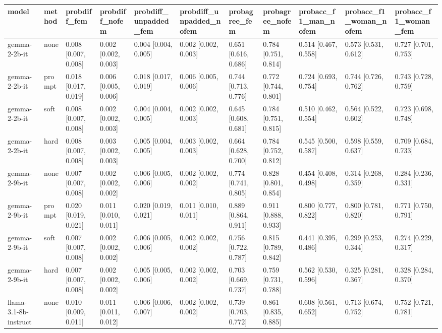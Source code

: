 \begin{tabular}{lllllllllll}
\toprule
model & method & probdiff_fem & probdiff_nofem & probdiff_unpadded_fem & probdiff_unpadded_nofem & probagree_fem & probagree_nofem & probacc_f1_man_nofem & probacc_f1_woman_nofem & probacc_f1_woman_fem \\
\midrule
gemma-2-2b-it & none & 0.008 [0.007, 0.008] & 0.002 [0.002, 0.003] & 0.004 [0.004, 0.005] & 0.002 [0.002, 0.003] & 0.651 [0.616, 0.686] & 0.784 [0.751, 0.814] & 0.514 [0.467, 0.558] & 0.573 [0.531, 0.612] & 0.727 [0.701, 0.753] \\
gemma-2-2b-it & prompt & 0.018 [0.017, 0.019] & 0.006 [0.005, 0.006] & 0.018 [0.017, 0.019] & 0.006 [0.005, 0.006] & 0.744 [0.713, 0.776] & 0.772 [0.744, 0.801] & 0.724 [0.693, 0.754] & 0.744 [0.726, 0.762] & 0.743 [0.728, 0.759] \\
gemma-2-2b-it & soft & 0.008 [0.007, 0.008] & 0.002 [0.002, 0.003] & 0.004 [0.004, 0.005] & 0.002 [0.002, 0.003] & 0.645 [0.608, 0.681] & 0.784 [0.751, 0.815] & 0.510 [0.462, 0.554] & 0.564 [0.522, 0.602] & 0.723 [0.698, 0.748] \\
gemma-2-2b-it & hard & 0.008 [0.007, 0.008] & 0.003 [0.002, 0.003] & 0.005 [0.004, 0.005] & 0.003 [0.002, 0.003] & 0.664 [0.628, 0.700] & 0.784 [0.752, 0.812] & 0.545 [0.500, 0.587] & 0.598 [0.559, 0.637] & 0.709 [0.684, 0.733] \\
gemma-2-9b-it & none & 0.007 [0.007, 0.008] & 0.002 [0.002, 0.002] & 0.006 [0.005, 0.006] & 0.002 [0.002, 0.002] & 0.774 [0.741, 0.805] & 0.828 [0.801, 0.854] & 0.454 [0.408, 0.498] & 0.314 [0.268, 0.359] & 0.284 [0.236, 0.331] \\
gemma-2-9b-it & prompt & 0.020 [0.019, 0.021] & 0.011 [0.010, 0.011] & 0.020 [0.019, 0.021] & 0.011 [0.010, 0.011] & 0.889 [0.864, 0.911] & 0.911 [0.888, 0.933] & 0.800 [0.777, 0.822] & 0.800 [0.781, 0.820] & 0.771 [0.750, 0.791] \\
gemma-2-9b-it & soft & 0.007 [0.007, 0.008] & 0.002 [0.002, 0.002] & 0.006 [0.005, 0.006] & 0.002 [0.002, 0.002] & 0.756 [0.722, 0.787] & 0.815 [0.789, 0.842] & 0.441 [0.395, 0.486] & 0.299 [0.253, 0.344] & 0.274 [0.229, 0.317] \\
gemma-2-9b-it & hard & 0.007 [0.007, 0.008] & 0.002 [0.002, 0.002] & 0.005 [0.005, 0.006] & 0.002 [0.002, 0.002] & 0.703 [0.669, 0.737] & 0.759 [0.731, 0.788] & 0.562 [0.530, 0.596] & 0.325 [0.281, 0.367] & 0.328 [0.284, 0.370] \\
llama-3.1-8b-instruct & none & 0.010 [0.009, 0.011] & 0.011 [0.011, 0.012] & 0.006 [0.006, 0.007] & 0.002 [0.002, 0.002] & 0.739 [0.703, 0.772] & 0.861 [0.835, 0.885] & 0.608 [0.561, 0.652] & 0.713 [0.674, 0.752] & 0.752 [0.721, 0.781] \\

\end{tabular}
